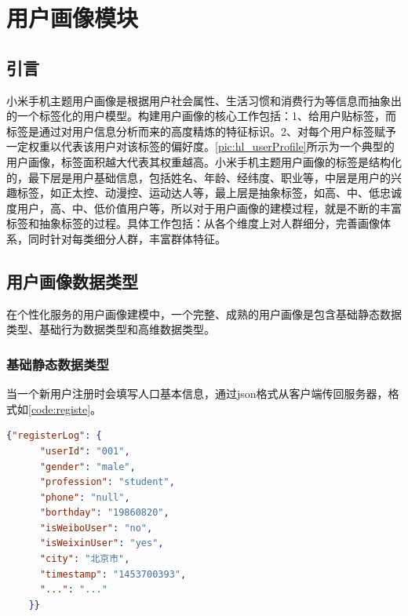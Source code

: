 
\chapter{用户画像模块}
\section{引言}

小米手机主题用户画像是根据用户社会属性、生活习惯和消费行为等信息而抽象出的一个标签化的用户模型。构建用户画像的核心工作包括：1、给用户贴标签，而标签是通过对用户信息分析而来的高度精炼的特征标识。2、对每个用户标签赋予一定权重以代表该用户对该标签的偏好度。\autoref{pic:hl_userProfile}所示为一个典型的用户画像，标签面积越大代表其权重越高。小米手机主题用户画像的标签是结构化的，最下层是用户基础信息，包括姓名、年龄、经纬度、职业等，中层是用户的兴趣标签，如正太控、动漫控、运动达人等，最上层是抽象标签，如高、中、低忠诚度用户，高、中、低价值用户等，所以对于用户画像的建模过程，就是不断的丰富标签和抽象标签的过程。具体工作包括：从各个维度上对人群细分，完善画像体系，同时针对每类细分人群，丰富群体特征。


\section{用户画像数据类型}
在个性化服务的用户画像建模中，一个完整、成熟的用户画像是包含基础静态数据类型、基础行为数据类型和高维数据类型。
\subsection{基础静态数据类型}
当一个新用户注册时会填写人口基本信息，通过json格式从客户端传回服务器，格式如\autoref{code:registe}。
\begin{lstlisting}[language=json,firstnumber=1,label={code:registe}]
    {"registerLog": {
      "userId": "001",
      "gender": "male",
      "profession": "student",
      "phone": "null",
      "borthday": "19860820",
      "isWeiboUser": "no",
      "isWeixinUser": "yes",
      "city": "北京市",
      "timestamp": "1453700393",
      "...": "..."
    }}
\end{lstlisting}

